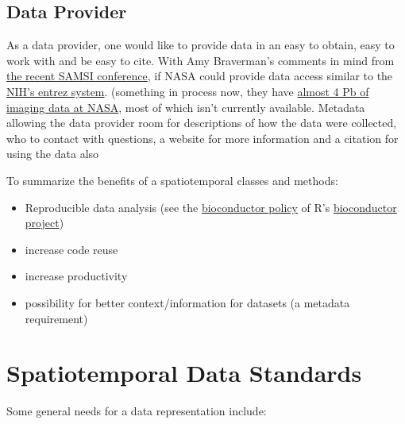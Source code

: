 \documentclass[12pt]{article}
\begin{document}
\subsection*{Data Provider}
As a data provider, one would like to provide data in an easy to
obtain, easy to work with and be easy to cite.  With Amy Braverman's
comments in mind from
\href{http://www.samsi.info/workshops/2009spatial-opening200909.shtml}{the
  recent SAMSI conference}, if NASA could provide data access similar to the
\href{http://www.ncbi.nlm.nih.gov/Entrez/}{NIH's entrez system}.
(something in process now, they have
\href{http://www-misr.jpl.nasa.gov/mission/data/getdata.html}{almost 4 Pb
  of imaging data at NASA}, most of which isn't currently available.
Metadata allowing the data provider room for descriptions of how the
data were collected, who to contact with questions, a website for more
information and a citation for using the data also 


To summarize the benefits of a spatiotemporal classes and methods:

\begin{itemize}
\item Reproducible data analysis (see the
  \href{http://www.bioconductor.org/docs/faq/index.html#Documentation\%20and\%20reproducible\%20research}{bioconductor
  policy} of R's \href{http://www.bioconductor.org}{bioconductor project})
\item increase code reuse
\item increase productivity
\item possibility for better context/information for datasets (a metadata requirement)
\end{itemize}



\section*{Spatiotemporal Data Standards}

Some general needs for a data representation include:
\end{document}
